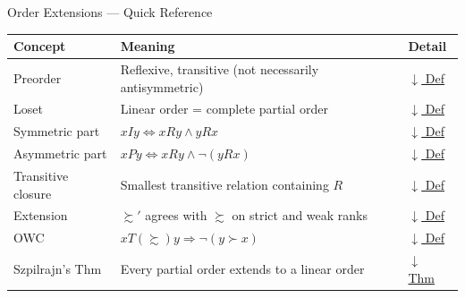 

\begin{toolkitbox}{Order Extensions --- Quick Reference}
\small
\begin{tabular}{l l l}
\toprule
\textbf{Concept} & \textbf{Meaning} & \textbf{Detail} \\
\midrule
Preorder            & Reflexive, transitive (not necessarily antisymmetric)         & \hyperref[def:preorder]{$\downarrow$ Def} \\
Loset               & Linear order = complete partial order                        & \hyperref[def:loset]{$\downarrow$ Def} \\
Symmetric part      & $xIy \iff xRy \land yRx$                                     & \hyperref[def:sym-asym]{$\downarrow$ Def} \\
Asymmetric part     & $xPy \iff xRy \land \lnot(yRx)$                              & \hyperref[def:sym-asym]{$\downarrow$ Def} \\
Transitive closure  & Smallest transitive relation containing $R$                  & \hyperref[def:trans-closure]{$\downarrow$ Def} \\
Extension           & $\succsim'$ agrees with $\succsim$ on strict and weak ranks  & \hyperref[def:extension]{$\downarrow$ Def} \\
OWC                 & $xT(\succsim)y \Rightarrow \lnot(y \succ x)$                 & \hyperref[def:owc]{$\downarrow$ Def} \\
Szpilrajn's Thm     & Every partial order extends to a linear order                & \hyperref[thm:szpilrajn]{$\downarrow$ Thm} \\
\bottomrule
\end{tabular}
\end{toolkitbox}



